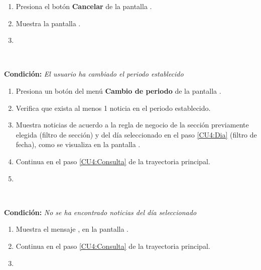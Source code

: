 \begin{enumerate}[{A-}1.]

	\item \actor Presiona el botón \textbf{Cancelar} de la pantalla .

	\item \sistema Muestra la pantalla .

	\item \finTA

\end{enumerate}


\begin{large}
	\\
\end{large}	
\textbf{Condición:} \textit{El usuario ha cambiado el periodo establecido}

\begin{enumerate}[{B-}1.]

	\item \actor \label{CU4:Dia}Presiona un botón del menú \textbf{Cambio de periodo} de la pantalla .

	\item \sistema Verifica que exista al menos 1 noticia en el periodo establecido. 

	\item \sistema Muestra noticias de acuerdo a la regla de negocio  de la sección previamente elegida (filtro de sección) y del día seleccionado en el paso \ref{CU4:Dia} (filtro de fecha), como se visualiza en la pantalla .

	\item \sistema Continua en el paso \ref{CU4:Consulta} de la trayectoria principal.

	\item \finTA

\end{enumerate}


\begin{large}
	\\
\end{large}	
\textbf{Condición:} \textit{No se ha encontrado noticias del día seleccionado }

\begin{enumerate}[{C-}1.]

	\item \sistema Muestra el mensaje , en la pantalla .

	\item \sistema Continua en el paso \ref{CU4:Consulta} de la trayectoria principal.

	\item \finTA

\end{enumerate}

